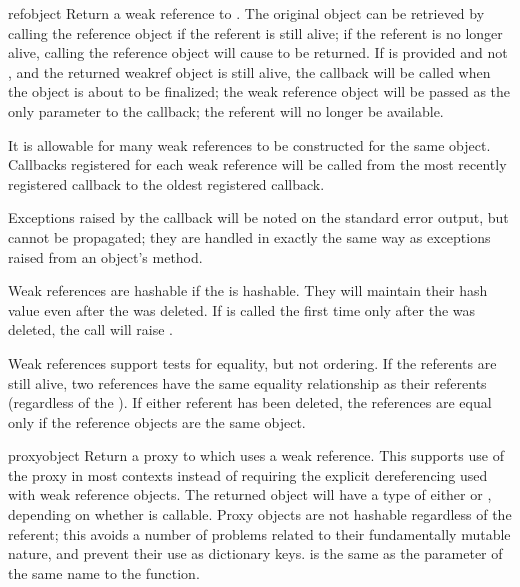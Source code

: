 \begin{classdesc}{ref}{object}
  Return a weak reference to .  The original object can be
  retrieved by calling the reference object if the referent is still
  alive; if the referent is no longer alive, calling the reference
  object will cause  to be returned.  If  is
  provided and not , and the returned weakref object is
  still alive, the callback will be called when the object is about to be
  finalized; the weak reference object will be passed as the only
  parameter to the callback; the referent will no longer be available.

  It is allowable for many weak references to be constructed for the
  same object.  Callbacks registered for each weak reference will be
  called from the most recently registered callback to the oldest
  registered callback.

  Exceptions raised by the callback will be noted on the standard
  error output, but cannot be propagated; they are handled in exactly
  the same way as exceptions raised from an object's
   method.

  Weak references are hashable if the  is hashable.  They
  will maintain their hash value even after the  was
  deleted.  If  is called the first time only after
  the  was deleted, the call will raise
  .

  Weak references support tests for equality, but not ordering.  If
  the referents are still alive, two references have the same
  equality relationship as their referents (regardless of the
  ).  If either referent has been deleted, the
  references are equal only if the reference objects are the same
  object.

\end{classdesc}

\begin{funcdesc}{proxy}{object}
  Return a proxy to  which uses a weak reference.  This
  supports use of the proxy in most contexts instead of requiring the
  explicit dereferencing used with weak reference objects.  The
  returned object will have a type of either  or
  , depending on whether  is
  callable.  Proxy objects are not hashable regardless of the
  referent; this avoids a number of problems related to their
  fundamentally mutable nature, and prevent their use as dictionary
  keys.   is the same as the parameter of the same name
  to the  function.
\end{funcdesc}

